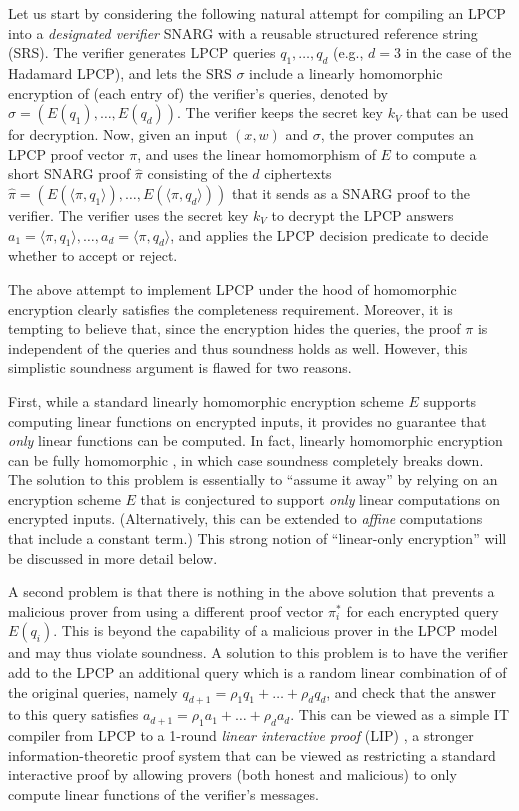 Let us start by considering the following natural attempt for compiling an LPCP into a {\em designated verifier} SNARG with a reusable structured reference string (SRS). 
The verifier generates LPCP queries $q_1,\ldots,q_d$ (e.g., $d=3$ in the case of the Hadamard LPCP), and lets the SRS $\sigma$ include a linearly homomorphic encryption of (each entry of) the verifier's queries, denoted by $\sigma = (E(q_1),\ldots,E(q_d))$.  
The verifier keeps the secret key $k_V$ that can be used for decryption. 
Now, given an input $(x,w)$ and $\sigma$, the prover computes an LPCP proof vector $\pi$, and uses the linear homomorphism of $E$ to compute a short SNARG proof $\hat\pi$ consisting of the $d$ ciphertexts $\hat\pi=(E(\langle \pi,q_1\rangle),\ldots,E(\langle \pi,q_d\rangle))$ that it sends as a SNARG proof to the verifier. 
The verifier uses the secret key $k_V$ to decrypt the LPCP answers $a_1=\langle \pi,q_1\rangle,\ldots,a_d=\langle \pi,q_d\rangle$, and applies the LPCP decision predicate to decide whether to accept or reject.

The above attempt to implement LPCP under the hood of homomorphic encryption clearly satisfies the completeness requirement. 
Moreover, it is tempting to believe that, since the encryption hides the queries, the proof $\pi$ is independent of the queries and thus soundness holds as well. 
However, this simplistic soundness argument is flawed for two reasons.
\loosen


First, while a standard linearly homomorphic encryption scheme $E$ supports computing linear functions on encrypted inputs, it provides no guarantee that {\em only} linear functions can be computed. 
In fact, linearly homomorphic encryption can be fully homomorphic \cite{2009:gen:a-FHE-scheme}, in which case soundness completely breaks down.
The solution to this problem is essentially to ``assume it away'' by relying on an encryption scheme $E$ that is conjectured to support {\em only} linear computations on encrypted inputs.
(Alternatively, this can be extended to {\em affine} computations that include a constant term.)
This strong notion of ``linear-only encryption'' \cite{2013:tcc:snargs-via-LIPs} will be discussed in more detail below. 


A second problem is that there is nothing in the above solution that prevents a malicious prover from using a different proof vector $\pi^*_i$ for each encrypted query $E(q_i)$.
This is beyond the capability of a malicious prover in the LPCP model and may thus violate soundness.
A solution to this problem is to have the verifier add to the LPCP an additional query which is a random linear combination of of the original queries, namely $q_{d+1}=\rho_1q_1+\ldots+\rho_d q_d$, and check that the answer to this query satisfies $a_{d+1}=\rho_1a_1+\ldots+\rho_da_d$.
This can be viewed as a simple IT compiler from LPCP to a 1-round {\em linear interactive proof} (LIP) \cite{2013:tcc:snargs-via-LIPs}, a stronger information-theoretic proof system that can be viewed as restricting a standard interactive proof by allowing provers (both honest and malicious) to only compute linear functions of the verifier's messages. 


